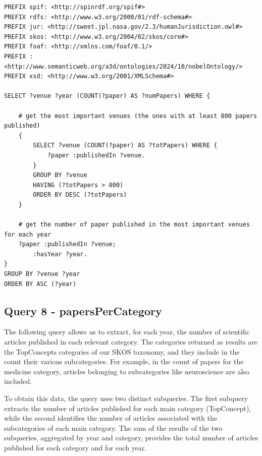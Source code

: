 \documentclass{article}
\begin{document}
\begin{lstlisting}
PREFIX spif: <http://spinrdf.org/spif#>
PREFIX rdfs: <http://www.w3.org/2000/01/rdf-schema#>
PREFIX jur: <http://sweet.jpl.nasa.gov/2.3/humanJurisdiction.owl#>
PREFIX skos: <http://www.w3.org/2004/02/skos/core#>
PREFIX foaf: <http://xmlns.com/foaf/0.1/>
PREFIX : <http://www.semanticweb.org/a3d/ontologies/2024/10/nobelOntology/>
PREFIX xsd: <http://www.w3.org/2001/XMLSchema#>

SELECT ?venue ?year (COUNT(?paper) AS ?numPapers) WHERE {

    # get the most important venues (the ones with at least 800 papers published)
    {
        SELECT ?venue (COUNT(?paper) AS ?totPapers) WHERE {
            ?paper :publishedIn ?venue.
        }
        GROUP BY ?venue
        HAVING (?totPapers > 800)
        ORDER BY DESC (?totPapers)
    }

    # get the number of paper published in the most important venues for each year
    ?paper :publishedIn ?venue;
        :hasYear ?year.
}
GROUP BY ?venue ?year
ORDER BY ASC (?year)    
\end{lstlisting}

\subsection*{Query 8 - papersPerCategory}
The following query allows us to extract, for each year, the number of scientific articles published in each relevant category. The categories returned
as results are the TopConcepts categories of our SKOS taxonomy, and they include in the count their various subcategories. For example, in the count
of papers for the medicine category, articles belonging to subcategories like neuroscience are also included.

\noindent To obtain this data, the query uses two distinct subqueries. The first subquery extracts the number of articles published for each main category
(TopConcept), while the second identifies the number of articles associated with the subcategories of each main category. The sum of the results of
the two subqueries, aggregated by year and category, provides the total number of articles published for each category and for each year.
\end{document}
